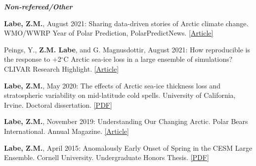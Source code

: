 \documentclass[margin,line,palatino,courier,10pt]{res}
\begin{document}
\begin{resume}
\textit{\textbf{Non-refereed/Other}}
\vspace*{-0.1in}\\
\begin{etaremune}[leftmargin=0in,topsep=0in,parsep=0in]
\item \textbf{Labe, Z.M.}, August 2021: Sharing data-driven stories of Arctic climate change. WMO/WWRP Year of Polar Prediction, PolarPredictNews. \href{https://www.polarprediction.net/fileadmin/user_upload/www.polarprediction.net/Home/News/PolarPredictNews/PolarPredictNews_18_screen.pdf}{[Article]}
\item Peings, Y., \textbf{Z.M. Labe}, and G. Magnusdottir, August 2021: How reproducible is the response to $+$2$^{\circ}$C Arctic sea-ice loss in a large ensemble of simulations? CLIVAR Research Highlight. \href{https://usclivar.org/research-highlights/how-reproducible-response-2degc-arctic-sea-ice-loss-large-ensemble-simulations}{[Article]}
\item \textbf{Labe, Z.M.}, May 2020: The effects of Arctic sea-ice thickness loss and stratospheric variability on mid-latitude cold spells. University of California, Irvine. Doctoral dissertation. \href{https://escholarship.org/uc/item/778982rr}{[PDF]}
\item \textbf{Labe, Z.M.}, November 2019: Understanding Our Changing Arctic. Polar Bears International. Annual Magazine. \href{https://polarbearsinternational.org/media/3480/pbi_2019_newsmag_web.pdf}{[Article]}
\item \textbf{Labe, Z.M.}, April 2015: Anomalously Early Onset of Spring in the CESM Large Ensemble. Cornell University. Undergraduate Honors Thesis. \href{https://zacklabe.files.wordpress.com/2022/08/d1f36-labe_thesis2015.pdf}{[PDF]}
\end{etaremune}

\vspace{-0.1in}
\noindent\textcolor{Cerulean}{\makebox[\linewidth][r]{\rule{\textwidth}{5pt}}}
\vspace{-0.3in} 


\end{resume}
\end{document}
